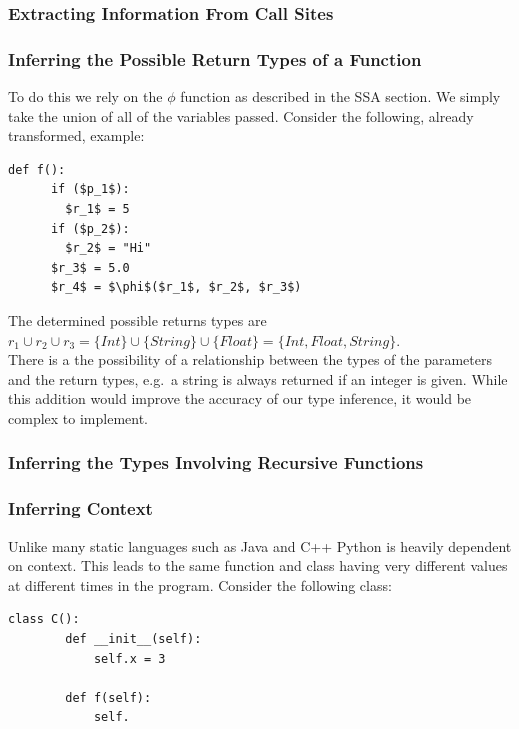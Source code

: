 \documentclass[12pt, titlepage]{article}
\begin{document}
\subsubsection{Extracting Information From Call Sites}

\subsubsection{Inferring the Possible Return Types of a Function}
To do this we rely on the $\phi$ function as described in the SSA section. We simply take the union of all of the variables passed. Consider the following, already transformed, example:
\begin{lstlisting}[mathescape]
	def f():
	  if ($p_1$):
	    $r_1$ = 5
	  if ($p_2$):
	    $r_2$ = "Hi"
	  $r_3$ = 5.0
	  $r_4$ = $\phi$($r_1$, $r_2$, $r_3$)
\end{lstlisting}
The determined possible returns types are $r_1 \cup r_2 \cup r_3 = \{Int\} \cup \{String\} \cup \{Float\} = \{Int, Float, String\}$. \\
There is a the possibility of a relationship between the types of the parameters and the return types, e.g.\ a string is always returned if an integer is given. While this addition would improve the accuracy of our type inference, it would be complex to implement.

\subsubsection{Inferring the Types Involving Recursive Functions}


\subsubsection{Inferring Context}
Unlike many static languages such as Java and C++ Python is heavily dependent on context. This leads to the same function and class having very different values at different times in the program. Consider the following class:
\begin{lstlisting}[mathescape]
	class C():
		def __init__(self):
			self.x = 3
			
		def f(self):
			self.
\end{lstlisting}
\end{document}
